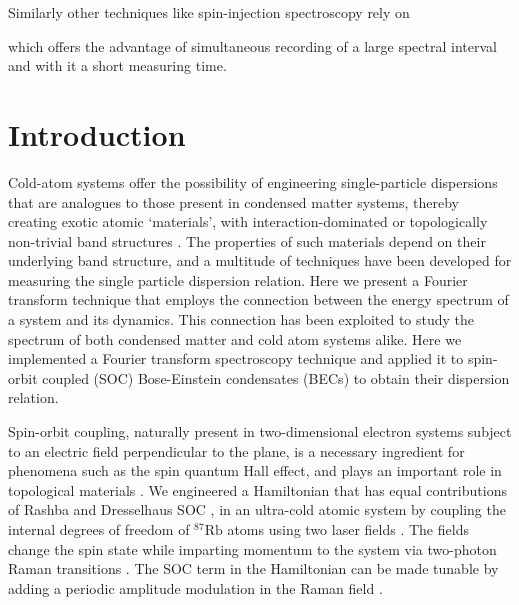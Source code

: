 Similarly other techniques like spin-injection spectroscopy rely on

which offers the advantage of simultaneous recording
of a large spectral interval and with it a short measuring time.
	 


\section{Introduction}



Cold-atom systems offer the possibility of engineering single-particle dispersions that are analogues to those present in condensed matter systems, thereby creating exotic atomic `materials', with interaction-dominated or topologically non-trivial band structures \cite{lindner_floquet_2011,radic_strong_2015}. The properties of such materials depend on their underlying band structure, and a multitude of techniques have been developed for measuring the single particle dispersion relation. Here we present a Fourier transform technique that employs the connection between the energy spectrum of a system and its dynamics. This connection has been exploited to study the spectrum of both condensed matter \cite{jonas_two-dimensional_2003} and cold atom systems \cite{yoshimura_diabatic-ramping_2014,wang_atom-interferometric_2015} alike. Here we implemented a Fourier transform spectroscopy technique and applied it to spin-orbit coupled (SOC) Bose-Einstein condensates (BECs) to obtain their dispersion relation.

Spin-orbit coupling, naturally present in two-dimensional electron systems subject to an electric field perpendicular to the plane, is a necessary ingredient for phenomena such as the spin quantum Hall effect, and plays an important role in topological materials \cite{bychkov_oscillatory_1984-1,hasan_textitcolloquium_2010}. We engineered a Hamiltonian that has equal contributions of Rashba and Dresselhaus SOC \cite{lin_spin-orbit-coupled_2011}, in an ultra-cold atomic system by coupling the internal degrees of freedom of $^{87}\mathrm{Rb}$ atoms using  two laser fields \cite{dalibard_textitcolloquium_2011}. The fields change the spin state while imparting momentum to the system via two-photon Raman transitions \cite{lan_raman-dressed_2014,campbell_magnetic_2016}. The SOC term in the Hamiltonian can be made tunable by adding a periodic amplitude modulation in the Raman field \cite{jimenez-garcia_tunable_2015}.


